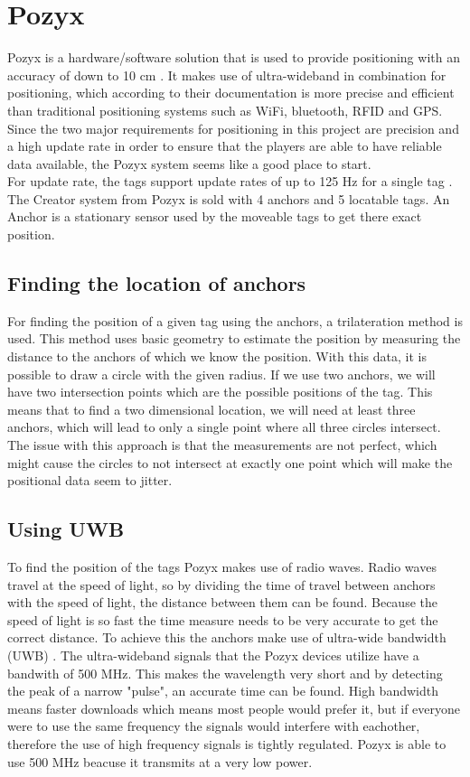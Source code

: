 \section{Pozyx}
Pozyx is a hardware/software solution that is used to provide positioning with an accuracy of down to 10 cm \cite{pozyx}.
It makes use of ultra-wideband in combination for positioning, which according to their documentation is more precise and efficient than traditional positioning systems such as WiFi, bluetooth, RFID and GPS.
\\
Since the two major requirements for positioning in this project are precision and a high update rate in order to ensure that the players are able to have reliable data available, the Pozyx system seems like a good place to start.
\\
For update rate, the tags support update rates of up to 125 Hz for a single tag \cite{pozyx}.
The Creator system from Pozyx is sold with 4 anchors and 5 locatable tags.
An Anchor is a stationary sensor used by the moveable tags to get there exact position.
\subsection{Finding the location of anchors}
For finding the position of a given tag using the anchors, a trilateration method is used.
This method uses basic geometry to estimate the position by measuring the distance to the anchors of which we know the position.
With this data, it is possible to draw a circle with the given radius.
If we use two anchors, we will have two intersection points which are the possible positions of the tag.
This means that to find a two dimensional location, we will need at least three anchors, which will lead to only a single point where all three circles intersect.
The issue with this approach is that the measurements are not perfect, which might cause the circles to not intersect at exactly one point which will make the positional data seem to jitter.

\subsection{Using UWB}
To find the position of the tags Pozyx makes use of radio waves. 
Radio waves travel at the speed of light, so by dividing the time of travel between anchors with the speed of light, the distance between them can be found.
Because the speed of light is so fast the time measure needs to be very accurate to get the correct distance.
To achieve this the anchors make use of ultra-wide bandwidth (UWB) \cite{pozyx-UWB}.
The ultra-wideband signals that the Pozyx devices utilize have a bandwith of 500 MHz.
This makes the wavelength very short and by detecting the peak of a narrow "pulse", an accurate time can be found.
High bandwidth means faster downloads which means most people would prefer it, but if everyone were to use the same frequency the signals would interfere with eachother, therefore the use of high frequency signals is tightly regulated.
Pozyx is able to use 500 MHz beacuse it transmits at a very low power.

